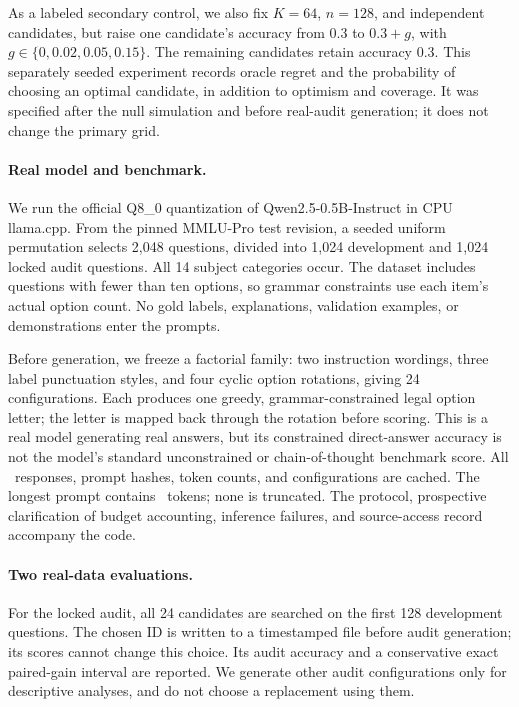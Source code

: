 \documentclass{article}
\begin{document}
As a labeled secondary control, we also fix $K=64$, $n=128$, and independent candidates, but raise one candidate's accuracy from $0.3$ to $0.3+g$, with $g\in\{0,0.02,0.05,0.15\}$. The remaining candidates retain accuracy $0.3$. This separately seeded experiment records oracle regret and the probability of choosing an optimal candidate, in addition to optimism and coverage. It was specified after the null simulation and before real-audit generation; it does not change the primary grid.

\paragraph{Real model and benchmark.}
We run the official Q8\_0 quantization of Qwen2.5-0.5B-Instruct in CPU llama.cpp. From the pinned MMLU-Pro test revision, a seeded uniform permutation selects 2,048 questions, divided into 1,024 development and 1,024 locked audit questions. All 14 subject categories occur. The dataset includes questions with fewer than ten options, so grammar constraints use each item's actual option count. No gold labels, explanations, validation examples, or demonstrations enter the prompts.

Before generation, we freeze a factorial family: two instruction wordings, three label punctuation styles, and four cyclic option rotations, giving 24 configurations. Each produces one greedy, grammar-constrained legal option letter; the letter is mapped back through the rotation before scoring. This is a real model generating real answers, but its constrained direct-answer accuracy is not the model's standard unconstrained or chain-of-thought benchmark score. All \TotalResponses\ responses, prompt hashes, token counts, and configurations are cached. The longest prompt contains \MaxPrompt\ tokens; none is truncated. The protocol, prospective clarification of budget accounting, inference failures, and source-access record accompany the code.

\paragraph{Two real-data evaluations.}
For the locked audit, all 24 candidates are searched on the first 128 development questions. The chosen ID is written to a timestamped file before audit generation; its scores cannot change this choice. Its audit accuracy and a conservative exact paired-gain interval are reported. We generate other audit configurations only for descriptive analyses, and do not choose a replacement using them.
\end{document}
